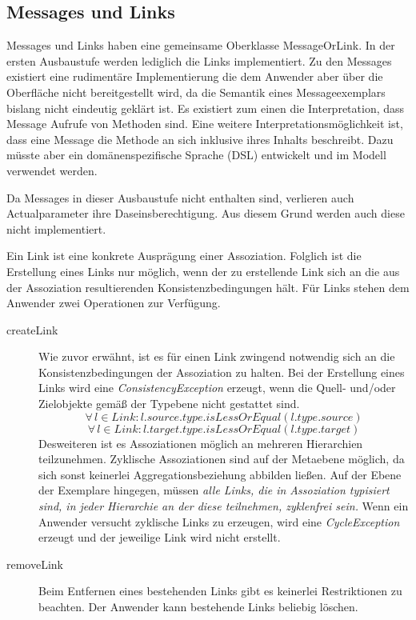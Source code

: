 \subsection{Messages und Links}

Messages und Links haben eine gemeinsame Oberklasse MessageOrLink. In der ersten Ausbaustufe werden lediglich die Links implementiert. Zu den Messages existiert eine rudimentäre
Implementierung die dem Anwender aber über die Oberfläche nicht bereitgestellt wird, da die 
Semantik eines Messageexemplars bislang nicht eindeutig geklärt ist.
Es existiert zum einen die Interpretation, dass Message Aufrufe von Methoden sind. Eine weitere Interpretationsmöglichkeit ist, dass eine Message die Methode an sich inklusive ihres Inhalts beschreibt. 
Dazu müsste aber ein domänenspezifische Sprache (DSL) entwickelt und im Modell verwendet werden.

Da Messages in dieser Ausbaustufe nicht enthalten sind, verlieren auch Actualparameter ihre Daseinsberechtigung. Aus diesem Grund werden auch diese nicht implementiert.

Ein Link ist eine konkrete Ausprägung einer Assoziation. Folglich ist die Erstellung eines Links nur möglich, wenn der zu erstellende Link sich an die aus der Assoziation resultierenden Konsistenzbedingungen hält. Für Links stehen dem Anwender zwei Operationen zur Verfügung.

\begin{description}
\item[createLink]
Wie zuvor erwähnt, ist es für einen Link zwingend notwendig sich an die Konsistenzbedingungen der Assoziation zu halten.
Bei der Erstellung eines Links wird eine \emph{ConsistencyException} erzeugt, wenn die Quell- und/oder Zielobjekte gemäß der Typebene nicht 
gestattet sind.
\begin{equation} \forall \, l \in Link: l.source.type.isLessOrEqual(l.type.source)
\end{equation} 
\begin{equation} \forall \, l \in Link: l.target.type.isLessOrEqual(l.type.target)
\end{equation}
Desweiteren ist es Assoziationen möglich an mehreren Hierarchien teilzunehmen. Zyklische Assoziationen sind auf der Metaebene möglich, 
da sich sonst keinerlei Aggregationsbeziehung abbilden ließen.
Auf der Ebene der Exemplare hingegen, müssen \emph{alle Links, die in Assoziation typisiert sind, in jeder Hierarchie an der diese teilnehmen, zyklenfrei sein.}
Wenn ein Anwender versucht zyklische Links zu erzeugen, wird eine \emph{CycleException} erzeugt und der jeweilige Link wird nicht erstellt.
\item[removeLink]
Beim Entfernen eines bestehenden Links gibt es keinerlei Restriktionen zu beachten. Der Anwender kann bestehende Links beliebig löschen.
\end{description}
